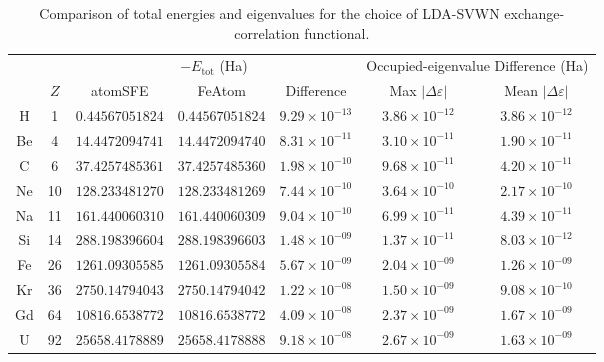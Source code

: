 \begin{table}[!htbp]
    \centering
    \footnotesize
    \setlength{\tabcolsep}{3pt}
    \caption{Comparison of total energies and eigenvalues for the choice of LDA-SVWN exchange-correlation functional.}
    \label{tab:ae-acc-lda-svwn-rep10}
    \begin{tabular}{@{}c c ccc cc@{}}
        \toprule
        & & \multicolumn{3}{c}{$-E_{\mathrm{tot}}$ (Ha)} & \multicolumn{2}{c}{Occupied-eigenvalue Difference (Ha)} \\
        \cmidrule(lr){3-5} \cmidrule(lr){6-7}
        & $Z$ & atomSFE & FeAtom & Difference & Max $|\Delta \varepsilon|$ & Mean $|\Delta \varepsilon|$ \\
        \midrule
        H  &  1 & $0.44567051824$  & $0.44567051824$  & $9.29\times10^{-13}$ & $3.86\times10^{-12}$ & $3.86\times10^{-12}$ \\
        Be &  4 & $14.4472094741$  & $14.4472094740$  & $8.31\times10^{-11}$ & $3.10\times10^{-11}$ & $1.90\times10^{-11}$ \\
        C  &  6 & $37.4257485361$  & $37.4257485360$  & $1.98\times10^{-10}$ & $9.68\times10^{-11}$ & $4.20\times10^{-11}$ \\
        Ne & 10 & $128.233481270$  & $128.233481269$  & $7.44\times10^{-10}$ & $3.64\times10^{-10}$ & $2.17\times10^{-10}$ \\
        Na & 11 & $161.440060310$  & $161.440060309$  & $9.04\times10^{-10}$ & $6.99\times10^{-11}$ & $4.39\times10^{-11}$ \\
        Si & 14 & $288.198396604$  & $288.198396603$  & $1.48\times10^{-09}$ & $1.37\times10^{-11}$ & $8.03\times10^{-12}$ \\
        Fe & 26 & $1261.09305585$  & $1261.09305584$  & $5.67\times10^{-09}$ & $2.04\times10^{-09}$ & $1.26\times10^{-09}$ \\
        Kr & 36 & $2750.14794043$  & $2750.14794042$  & $1.22\times10^{-08}$ & $1.50\times10^{-09}$ & $9.08\times10^{-10}$ \\
        Gd & 64 & $10816.6538772$  & $10816.6538772$  & $4.09\times10^{-08}$ & $2.37\times10^{-09}$ & $1.67\times10^{-09}$ \\
        U  & 92 & $25658.4178889$  & $25658.4178888$  & $9.18\times10^{-08}$ & $2.67\times10^{-09}$ & $1.63\times10^{-09}$ \\
        \bottomrule
    \end{tabular}
\end{table}

